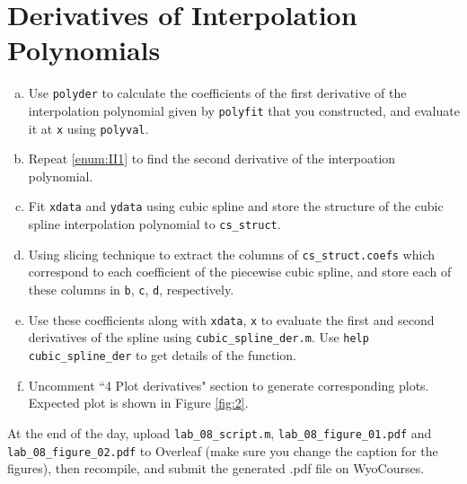 \section{Derivatives of Interpolation Polynomials}
\begin{enumerate}[(a)]
\item \label{enum:II1} Use \verb|polyder| to calculate the coefficients of the first derivative of the interpolation polynomial given by \verb|polyfit| that you constructed, and evaluate it at \verb|x| using \verb|polyval|.
\item Repeat \eqref{enum:II1} to find the second derivative of the interpoation polynomial.
    \item Fit \verb|xdata| and \verb|ydata| using cubic spline and store the structure of the cubic spline interpolation polynomial to \verb|cs_struct|.
    \item Using slicing technique to extract the columns of \verb|cs_struct.coefs| which correspond to each coefficient of the piecewise cubic spline, and store each of these columns in \verb|b|, \verb|c|, \verb|d|, respectively.
    \item Use these coefficients along with \verb|xdata|, \verb|x| to evaluate the first and second derivatives of the spline using \verb|cubic_spline_der.m|. Use \verb|help cubic_spline_der| to get details of the function.
    \item Uncomment ``4 Plot derivatives" section to generate corresponding plots. Expected plot is shown in Figure \ref{fig:2}.
\end{enumerate}

At the end of the day, upload \verb|lab_08_script.m|, \verb|lab_08_figure_01.pdf| and \verb|lab_08_figure_02.pdf| to Overleaf (make sure you change the caption for the figures), then recompile, and submit the generated .pdf file on WyoCourses.


